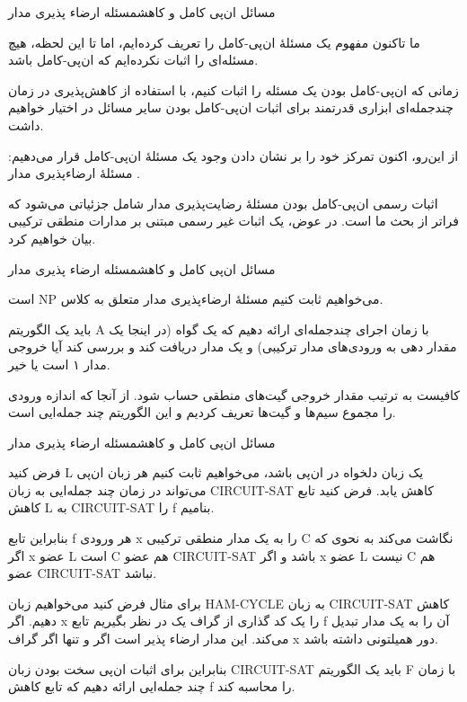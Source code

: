 \begin{itemframe-s}{مسائل ان‌پی کامل و کاهش}{مسئله ارضاء پذیری مدار}
\item[-]
ما تاکنون مفهوم یک مسئلهٔ ان‌پی‌-کامل را تعریف کرده‌ایم، اما تا این لحظه، هیچ مسئله‌ای را اثبات نکرده‌ایم که ان‌پی‌-کامل باشد.
\item[-]
زمانی که ان‌پی‌-کامل بودن یک مسئله را اثبات کنیم، با استفاده از کاهش‌پذیری در زمان چندجمله‌ای ابزاری قدرتمند برای اثبات ان‌پی‌-کامل بودن سایر مسائل در اختیار خواهیم داشت.
\item[-]
از این‌رو، اکنون تمرکز خود را بر نشان دادن وجود یک مسئلهٔ ان‌پی‌-کامل قرار می‌دهیم: مسئلهٔ ارضاء‌پذیری مدار
 .

\item[-]
اثبات رسمی ان‌پی‌-کامل بودن مسئلهٔ رضایت‌پذیری مدار شامل جزئیاتی می‌شود که فراتر از بحث ما است. در عوض، یک اثبات غیر رسمی مبتنی بر مدارات منطقی ترکیبی بیان خواهیم کرد.
\end{itemframe-s}


\begin{itemframe-s}{مسائل ان‌پی کامل و کاهش}{مسئله ارضاء پذیری مدار}
\item[-]
می‌خواهیم ثابت کنیم مسئلهٔ ارضاء‌پذیری مدار متعلق به کلاس $\mathrm{NP}$ است.

\item[-]
باید یک الگوریتم A با زمان اجرای چندجمله‌ای ارائه ‌دهیم که یک گواه (در اینجا یک مقدار دهی به ورودی‌های مدار ترکیبی) و یک مدار دریافت کند و بررسی کند آیا خروجی مدار ۱ است یا خیر.

\item[-]
کافیست به ترتیب مقدار خروجی گیت‌های منطقی حساب شود. از آنجا که اندازه ورودی را مجموع سیم‌ها و گیت‌ها تعریف کردیم و این الگوریتم چند جمله‌ایی است.
\end{itemframe-s}


\begin{itemframe-s}{مسائل ان‌پی کامل و کاهش}{مسئله ارضاء پذیری مدار}
\item[-]
فرض کنید L یک زبان دلخواه در ان‌پی باشد، می‌خواهیم ثابت کنیم هر زبان ان‌پی می‌تواند در زمان چند جمله‌ایی به زبان CIRCUIT-SAT کاهش یابد. فرض کنید تابع کاهش L به CIRCUIT-SAT را f بنامیم.
\item[-]
بنابراین تابع f هر ورودی x را به یک مدار منطقی ترکیبی C نگاشت می‌کند به نحوی که اگر x عضو L است C هم عضو CIRCUIT-SAT باشد و اگر x عضو L نیست C هم عضو CIRCUIT-SAT نباشد.
\item[-]
برای مثال فرض کنید می‌خواهیم زبان HAM-CYCLE به زبان CIRCUIT-SAT کاهش دهیم. اگر x را یک کد گذاری از گراف یک در نظر بگیریم تابع f آن را به یک مدار تبدیل می‌کند. این مدار ارضاء پذیر است اگر و تنها اگر گراف x دور همیلتونی داشته باشد.
\item[-]
بنابراین برای اثبات ان‌پی سخت بودن زبان CIRCUIT-SAT باید یک الگوریتم F با زمان چند جمله‌ایی ارائه دهیم که تابع کاهش f را محاسبه کند.
\end{itemframe-s}


